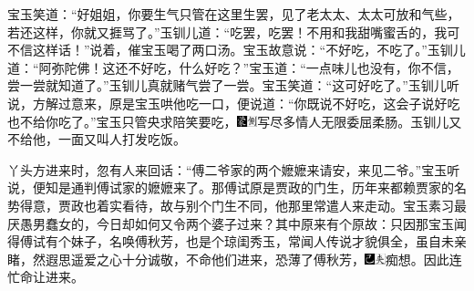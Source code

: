 宝玉笑道：``好姐姐，你要生气只管在这里生罢，见了老太太、太太可放和气些，若还这样，你就又捱骂了。''玉钏儿道：``吃罢，吃罢！不用和我甜嘴蜜舌的，我可不信这样话！''说着，催宝玉喝了两口汤。宝玉故意说：``不好吃，不吃了。''玉钏儿道：``阿弥陀佛！这还不好吃，什么好吃？''宝玉道：``一点味儿也没有，你不信，尝一尝就知道了。''玉钏儿真就赌气尝了一尝。宝玉笑道：``这可好吃了。''玉钏儿听说，方解过意来，原是宝玉哄他吃一口，便说道：``你既说不好吃，这会子说好吃也不给你吃了。''宝玉只管央求陪笑要吃，{\includegraphics[width=3mm]{../Images/00006}\includegraphics[width=3mm]{../Images/00011}\footnotesize \kaishu 写尽多情人无限委屈柔肠。}玉钏儿又不给他，一面又叫人打发吃饭。

丫头方进来时，忽有人来回话：``傅二爷家的两个嬷嬷来请安，来见二爷。''宝玉听说，便知是通判傅试家的嬷嬷来了。那傅试原是贾政的门生，历年来都赖贾家的名势得意，贾政也着实看待，故与别个门生不同，他那里常遣人来走动。宝玉素习最厌愚男蠢女的，今日却如何又令两个婆子过来？其中原来有个原故：只因那宝玉闻得傅试有个妹子，名唤傅秋芳，也是个琼闺秀玉，常闻人传说才貌俱全，虽自未亲睹，然遐思遥爱之心十分诚敬，不命他们进来，恐薄了傅秋芳，{\includegraphics[width=3mm]{../Images/00003}\includegraphics[width=3mm]{../Images/00012}\footnotesize \kaishu 痴想。}因此连忙命让进来。

